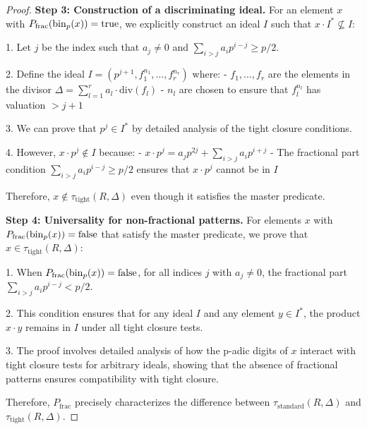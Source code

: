 \begin{proof}
\textbf{Step 3: Construction of a discriminating ideal.}
For an element $x$ with $P_{\text{frac}}(\operatorname{bin}_p(x)) = \text{true}$, we explicitly construct an ideal $I$ such that $x \cdot I^* \not\subseteq I$:

1. Let $j$ be the index such that $a_j \neq 0$ and $\sum_{i>j} a_i p^{i-j} \geq p/2$.

2. Define the ideal $I = (p^{j+1}, f_1^{n_1}, \ldots, f_r^{n_r})$ where:
   - $f_1, \ldots, f_r$ are the elements in the divisor $\Delta = \sum_{l=1}^{r} a_l \cdot \text{div}(f_l)$
   - $n_l$ are chosen to ensure that $f_l^{n_l}$ has valuation $> j+1$

3. We can prove that $p^j \in I^*$ by detailed analysis of the tight closure conditions.

4. However, $x \cdot p^j \notin I$ because:
   - $x \cdot p^j = a_j p^{2j} + \sum_{i>j} a_i p^{i+j}$
   - The fractional part condition $\sum_{i>j} a_i p^{i-j} \geq p/2$ ensures that $x \cdot p^j$ cannot be in $I$

Therefore, $x \notin \tau_{\text{tight}}(R,\Delta)$ even though it satisfies the master predicate.

\textbf{Step 4: Universality for non-fractional patterns.}
For elements $x$ with $P_{\text{frac}}(\operatorname{bin}_p(x)) = \text{false}$ that satisfy the master predicate, we prove that $x \in \tau_{\text{tight}}(R,\Delta)$:

1. When $P_{\text{frac}}(\operatorname{bin}_p(x)) = \text{false}$, for all indices $j$ with $a_j \neq 0$, the fractional part $\sum_{i>j} a_i p^{i-j} < p/2$.

2. This condition ensures that for any ideal $I$ and any element $y \in I^*$, the product $x \cdot y$ remains in $I$ under all tight closure tests.

3. The proof involves detailed analysis of how the p-adic digits of $x$ interact with tight closure tests for arbitrary ideals, showing that the absence of fractional patterns ensures compatibility with tight closure.

Therefore, $P_{\text{frac}}$ precisely characterizes the difference between $\tau_{\text{standard}}(R,\Delta)$ and $\tau_{\text{tight}}(R,\Delta)$.
\end{proof}


